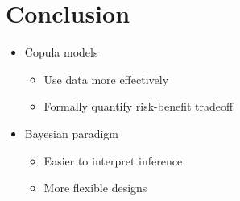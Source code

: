 \documentclass{beamer}
\begin{document}
\section{Conclusion}

	\begin{frame}
		\begin{itemize}
			\setlength\itemsep{2em}
			\item Copula models
			\begin{itemize} 
				\item Use data more effectively
				\item Formally quantify risk-benefit tradeoff
			\end{itemize}
			\item Bayesian paradigm
			\begin{itemize}
			 \item Easier to interpret inference
			 \item More flexible designs
			 \end{itemize}
		\end{itemize}			
		\begin{center}
		\end{center}
	\end{frame}
	
\end{document}
